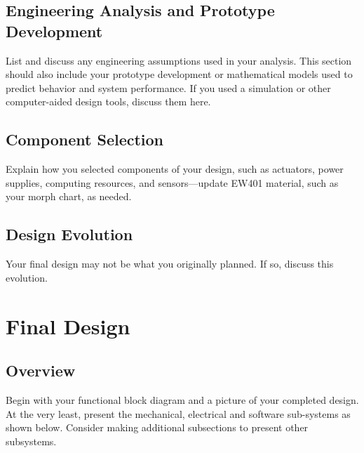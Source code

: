 \documentclass{wrcecapstone}
\begin{document}
\subsection{Engineering Analysis and Prototype Development}
List and discuss any engineering assumptions used in your analysis. This section should also include your prototype development or mathematical models used to predict behavior and system performance.  If you used a simulation or other computer-aided design tools, discuss them here. 

\subsection{Component Selection}
Explain how you selected components of your design, such as actuators, power supplies, computing resources, and sensors—update EW401 material, such as your morph chart, as needed.  

\subsection{Design Evolution}
Your final design may not be what you originally planned. If so, discuss this evolution.
 





\section{Final Design}

\subsection{Overview}
Begin with your functional block diagram and a picture of your completed design.   At the very least, present the mechanical, electrical and software sub-systems as shown below.  Consider making additional subsections to present other subsystems.   
\end{document}
